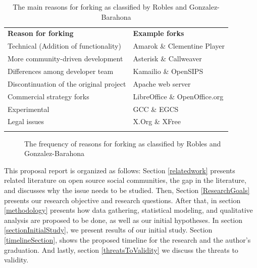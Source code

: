 \documentclass[11pt]{report}
\begin{document}
\begin{table}[!ht]
\centering
\caption[The main reasons for forking]{The main reasons for forking as classified by Robles and Gonzalez-Barahona \cite{Robles}}
\label{tableReasonsForForking}
\begin{tabular}{p{} p{}}
\hline\noalign{\smallskip}
\textbf{Reason for forking} & \textbf{Example forks} \\
\noalign{\smallskip}\hline\noalign{\smallskip}
Technical (Addition of functionality) & Amarok \& Clementine Player \\ \hline
More community-driven development & Asterisk \& Callweaver \\ \hline
Differences among developer team & Kamailio \& OpenSIPS \\ \hline
Discontinuation of the original project & Apache web server \\ \hline
Commercial strategy forks & LibreOffice \& OpenOffice.org \\ \hline
Experimental & GCC \& EGCS \\ \hline
Legal issues & X.Org \& XFree\\
\noalign{\smallskip}\hline
\end{tabular}
\end{table}

\begin{figure} [!ht]
\centering
\caption[The frequency of reasons for forking]{The frequency of reasons for forking as classified by Robles and Gonzalez-Barahona \cite{Robles}}
\label{figureReasonsForForkingPieChart}
\end{figure}

This proposal report is organized as follows: Section \ref{relatedwork} presents related literature on open source social communities, the gap in the literature, and discusses why the issue needs to be studied. 
Then, Section \ref{ResearchGoals} presents our research objective and research questions. After that, in section \ref{methodology} presents how data gathering, statistical modeling, and qualitative analysis are proposed to be done, as well as our initial hypotheses. In section \ref{sectionInitialStudy}, we present results of our initial study. Section \ref{timelineSection}, shows the proposed timeline for the research and the author's graduation. And lastly, section \ref{threatsToValidity} we discuss the threats to validity.\\
\pagebreak
\end{document}
